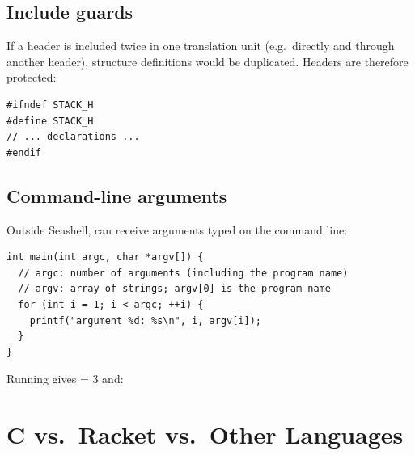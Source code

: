 \subsection{Include guards}

If a header is included twice in one translation unit (e.g.\ directly and through another
header), structure definitions would be duplicated. Headers are therefore protected:
\begin{lstlisting}[style=c]
#ifndef STACK_H
#define STACK_H
// ... declarations ...
#endif
\end{lstlisting}

\subsection{Command-line arguments}

Outside Seashell,  can receive arguments typed on the command line:
\begin{lstlisting}[style=c]
int main(int argc, char *argv[]) {
  // argc: number of arguments (including the program name)
  // argv: array of strings; argv[0] is the program name
  for (int i = 1; i < argc; ++i) {
    printf("argument %d: %s\n", i, argv[i]);
  }
}
\end{lstlisting}

Running  gives  = 3 and:

\begin{center}
\end{center}

\section{C vs.\ Racket vs.\ Other Languages}

